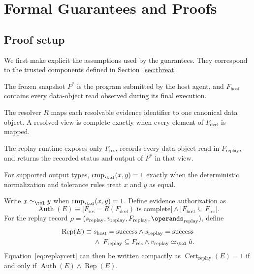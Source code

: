 \appendix
\section{Formal Guarantees and Proofs}
\label{app:proofs}

\subsection{Proof setup}

We first make explicit the assumptions used by the guarantees.
They correspond to the trusted components defined in
Section~\ref{sec:threat}.

\begin{description}
\setlength{\itemsep}{1pt}
\setlength{\parskip}{0pt}

\item[(A1) Trace fidelity.]
The frozen snapshot $P^*$ is the program submitted by the host
agent, and $F_{\mathrm{host}}$ contains every data-object read
observed during its final execution.

\item[(A2) Resolution consistency.]
The resolver $R$ maps each resolvable evidence identifier to one
canonical data object. A resolved view is complete exactly when
every element of $F_{\mathrm{decl}}$ is mapped.

\item[(A3) Replay confinement.]
The replay runtime exposes only $F_{\mathrm{res}}$, records every
data-object read in $F_{\mathrm{replay}}$, and returns the recorded
status and output of $P^*$ in that view.

\item[(A4) Comparator consistency.]
For supported output types,
$\operatorname{cmp}_{\tol}(x,y)=1$ exactly when the deterministic
normalization and tolerance rules treat $x$ and $y$ as equal.
\end{description}

Write $x\simeq_{\tol}y$ when
$\operatorname{cmp}_{\tol}(x,y)=1$. Define evidence
authorization as
\[
\operatorname{Auth}(E)
\equiv
\bigl[
F_{\mathrm{res}}=R(F_{\mathrm{decl}})
\text{ is complete}
\bigr]
\land
\bigl[
F_{\mathrm{host}}\subseteq F_{\mathrm{res}}
\bigr].
\]
For the replay record
$\rho=
(s_{\mathrm{replay}},v_{\mathrm{replay}},
F_{\mathrm{replay}},\operands_{\mathrm{replay}})$, define
\[
\begin{aligned}
\operatorname{Rep}(E)\equiv\;&
s_{\mathrm{host}}=\mathrm{success}
\land
s_{\mathrm{replay}}=\mathrm{success}\\
&\land\;
F_{\mathrm{replay}}\subseteq F_{\mathrm{res}}
\land
v_{\mathrm{replay}}\simeq_{\tol}\hat a .
\end{aligned}
\]
Equation~\ref{eq:replaycert} can then be written compactly as
$\operatorname{Cert}_{\mathrm{replay}}(E)=1$ if and only if
$\operatorname{Auth}(E)\land\operatorname{Rep}(E)$.

